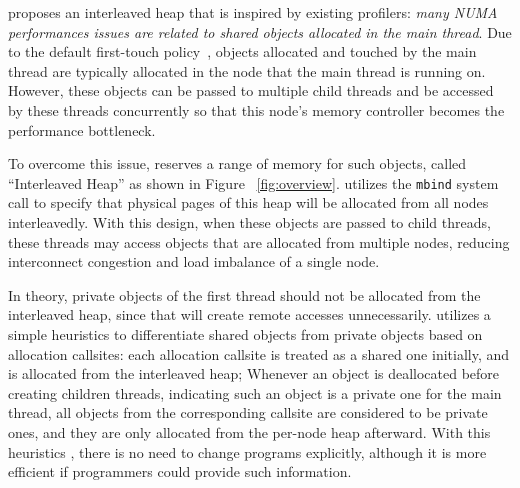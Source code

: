\NA{} proposes an interleaved heap that is inspired by existing profilers\cite{XuNuma, MemProf}: \textit{many NUMA performances issues are related to shared objects allocated in the main thread}. Due to the default first-touch policy~\cite{lameter2013numa, diener2015locality}, objects allocated and touched by the main thread are typically allocated in the node that the main thread is running on. However, these objects can be passed to multiple child threads and be accessed by these threads concurrently so that this node's memory controller becomes the performance bottleneck. 

To overcome this issue, \NA{} reserves a range of memory for such objects, called ``Interleaved Heap'' as shown in Figure ~\ref{fig:overview}. \NA{} utilizes the \texttt{mbind} system call to specify that physical pages of this heap will be allocated from all nodes interleavedly. With this design, when these objects are passed to child threads, these threads may access objects that are allocated from multiple nodes, reducing interconnect congestion and load imbalance of a single node. 

In theory, private objects of the first thread should not be allocated from the interleaved heap, since that will create remote accesses unnecessarily. \NM{} utilizes a simple heuristics to differentiate shared objects from private objects based on allocation callsites: each allocation callsite is treated as a shared one initially, and is allocated from the interleaved heap; Whenever an object is deallocated before creating children threads, indicating such an object is a private one for the main thread, all objects from the corresponding callsite are considered to be private ones, and they are only allocated from the per-node heap afterward. With this heuristics , there is no need to change programs explicitly, although it is more efficient if programmers could provide such information. 


